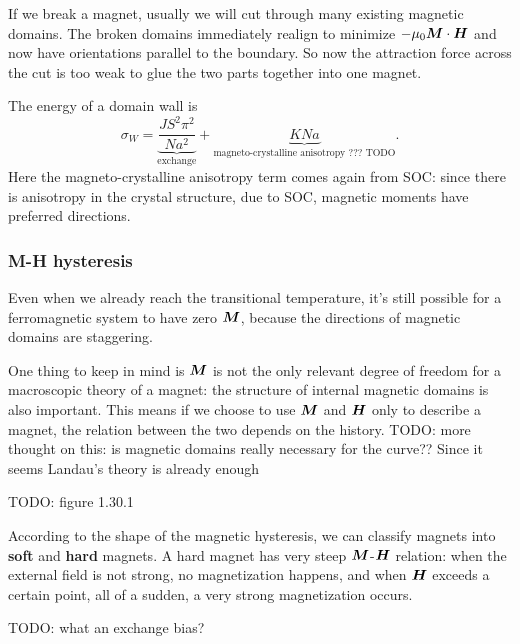 \documentclass[hyperref, a4paper]{article}
\newcommand*{\concept}[1]{{\textbf{#1}}}
\begin{document}
If we break a magnet,
usually we will cut through many existing magnetic domains.
The broken domains immediately 
realign to minimize $- \mu_0 \vb*{M} \cdot \vb*{H}$
and now have orientations parallel to the boundary.
So now the attraction force across the cut 
is too weak to glue the two parts together into one magnet.

The energy of a domain wall is 
\begin{equation}
    \sigma_W = \underbrace{\frac{J S^2 \pi^2}{N a^2}}_{\text{exchange}} 
    + \underbrace{KNa}_\text{magneto-crystalline anisotropy ??? TODO}.
\end{equation}
Here the magneto-crystalline anisotropy term comes again from SOC: 
since there is anisotropy in the crystal structure, 
due to SOC, 
magnetic moments have preferred directions.

\subsubsection{M-H hysteresis}

Even when we already reach the transitional temperature,
it's still possible for a ferromagnetic system to have zero $\vb*{M}$,
because the directions of magnetic domains are staggering.

One thing to keep in mind is $\vb*{M}$ is not the only relevant degree of freedom 
for a macroscopic theory of a magnet:
the structure of internal magnetic domains is also important.
This means if we choose to use $\vb*{M}$ and $\vb*{H}$ only 
to describe a magnet,
the relation between the two depends on the history.  
TODO: more thought on this: is magnetic domains really necessary for the curve??
Since it seems Landau's theory is already enough

TODO: figure 1.30.1

According to the shape of the magnetic hysteresis,
we can classify magnets into \concept{soft} and \concept{hard} magnets. 
A hard magnet has very steep $\vb*{M}$-$\vb*{H}$ relation:
when the external field is not strong, 
no magnetization happens, 
and when $\vb*{H}$ exceeds a certain point, 
all of a sudden, 
a very strong magnetization occurs. 

TODO: what an exchange bias?
\end{document}
